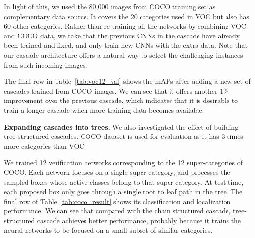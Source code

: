 \documentclass[10pt,twocolumn,letterpaper]{article}
\begin{document}
In light of this, we used the 80,000 images from COCO training set as complementary data source. It covers the 20 categories used in VOC but also has 60 other categories. Rather than re-training all the networks by combining VOC and COCO data, we take that the previous CNNs in the cascade have already been trained and fixed, and only train new CNNs with the extra data. Note that our cascade architecture offers a natural way to select the challenging instances from such incoming images.

The final row in Table~\ref{tab:voc12_val} shows the mAPs after adding a new set of cascades trained from COCO images. We can see that it offers another 1\% improvement over the previous cascade, which indicates that it is desirable to train a longer cascade when more training data becomes available.


\textbf{Expanding cascades into trees.} We also investigated the effect of building tree-structured cascades. COCO dataset is used for evaluation as it has 3 times more categories than VOC. 

We trained 12 verification networks corresponding to the 12 super-categories of COCO. Each network focuses on a single super-category, and processes the sampled boxes whose active classes belong to that super-category. At test time, each proposed box only goes through a single root to leaf path in the tree. The final row of Table~\ref{tab:coco_result} shows its classification and localization performance. We can see that compared with the chain structured cascade, tree-structured cascade achieves better performance, probably because it trains the neural networks to be focused on a small subset of similar categories.
\end{document}
